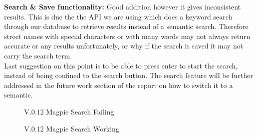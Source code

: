 \noindent \textbf{Search \& Save functionality: }
Good addition however it gives inconsistent results. This is due the the API we are using which does a keyword search through our database to retrieve results instead of a semantic search. Therefore street names with special characters or with many words may not always return accurate or any results unfortunately, or why if the search is saved it may not carry the search term.\\
Last suggestion on this point is to be able to press enter to start the search, instead of being confined to the search button. The search feature will be further addressed in the future work section of the report on how to switch it to a semantic.\\
\begin{figure}[h!]
    \centering
    \caption{V.0.12 Magpie Search Failing}
\end{figure}
\begin{figure}[h!]
    \centering
    \caption{V.0.12 Magpie Search Working}
\end{figure}


